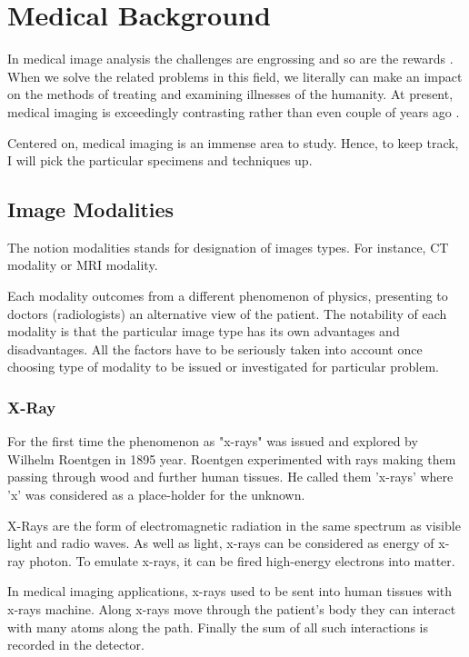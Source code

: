 \chapter{Medical Background}
\label{ch:rworks}

In medical image analysis the challenges are engrossing and so are the rewards \cite{Duncan2000}. When we solve the related problems in this field, we literally can make an impact on the methods of treating and examining illnesses of the humanity. At present, medical imaging is exceedingly contrasting rather than even couple of years ago \cite{Wang2020}. 

Centered on, medical imaging is an immense area to study. Hence, to keep track, I will pick the particular specimens and techniques up.

\section{Image Modalities}
The notion modalities \cite{Seeram2004} stands for designation of images types. For instance, CT modality or MRI modality. 

Each modality outcomes from a different phenomenon of physics, presenting to doctors (radiologists) an alternative view of the patient. The notability of each modality is that the particular image type has its own advantages and disadvantages. All the factors have to be seriously taken into account once choosing type of modality to be issued or investigated for particular problem.

\subsection{X-Ray}
For the first time the phenomenon as "x-rays" was issued and explored by Wilhelm Roentgen in 1895 year. Roentgen experimented with rays making them passing through wood and further human tissues. He called them \cite{Barker1996} 'x-rays' where 'x' was considered as a place-holder for the unknown.

X-Rays are the form of electromagnetic radiation in the same spectrum as visible light and radio waves. As well as light, x-rays can be considered as energy of x-ray photon. To emulate x-rays, it can be fired high-energy electrons into matter. 

In medical imaging applications, x-rays used to be sent into human tissues with x-rays machine. Along x-rays move through the patient's body they can interact with many atoms along the path. Finally the sum of all such interactions is recorded in the detector. 

